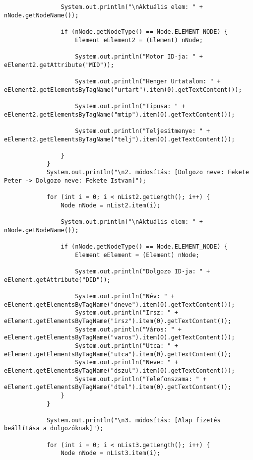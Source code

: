 \documentclass[14pt]{extarticle}
\begin{document}
\begin{normalsize}
\begin{verbatim}
	            System.out.println("\nAktuális elem: " + nNode.getNodeName());

	            if (nNode.getNodeType() == Node.ELEMENT_NODE) {
	                Element eElement2 = (Element) nNode;

	                System.out.println("Motor ID-ja: " + eElement2.getAttribute("MID"));

	                System.out.println("Henger Urtatalom: " + eElement2.getElementsByTagName("urtart").item(0).getTextContent());
	                
	                System.out.println("Tipusa: " + eElement2.getElementsByTagName("mtip").item(0).getTextContent());
	                
	                System.out.println("Teljesitmenye: " + eElement2.getElementsByTagName("telj").item(0).getTextContent());

	            }
	        }
			System.out.println("\n2. módosítás: [Dolgozo neve: Fekete Peter -> Dolgozo neve: Fekete Istvan]");
			
			for (int i = 0; i < nList2.getLength(); i++) {
	            Node nNode = nList2.item(i);

	            System.out.println("\nAktuális elem: " + nNode.getNodeName());

	            if (nNode.getNodeType() == Node.ELEMENT_NODE) {
	                Element eElement = (Element) nNode;

	                System.out.println("Dolgozo ID-ja: " + eElement.getAttribute("DID"));

	                System.out.println("Név: " + eElement.getElementsByTagName("dneve").item(0).getTextContent());
	                System.out.println("Irsz: " + eElement.getElementsByTagName("irsz").item(0).getTextContent());
	                System.out.println("Város: " + eElement.getElementsByTagName("varos").item(0).getTextContent());
	                System.out.println("Utca: " + eElement.getElementsByTagName("utca").item(0).getTextContent());
	                System.out.println("Neve: " + eElement.getElementsByTagName("dszul").item(0).getTextContent());
	                System.out.println("Telefonszama: " + eElement.getElementsByTagName("dtel").item(0).getTextContent());
	            }
	        }
			
			System.out.println("\n3. módosítás: [Alap fizetés beállítása a dolgozóknak]");
			
			for (int i = 0; i < nList3.getLength(); i++) {
	            Node nNode = nList3.item(i);


\end{verbatim}
\end{normalsize}
\end{document}
